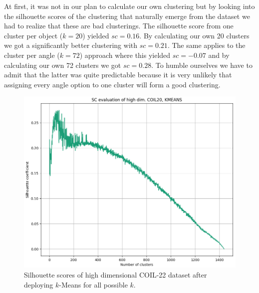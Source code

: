 At first, it was not in our plan to calculate our own clustering but by looking into the silhouette scores of the clustering that naturally emerge from the dataset we had to realize that these are bad clusterings. The silhouette score from one cluster per object ($k=20$) yielded $sc=0.16$. By calculating our own 20 clusters we got a significantly better clustering with $sc=0.21$. The same applies to the cluster per angle ($k=72$) approach where this yielded $sc=-0.07$ and by calculating our own 72 clusters we got $sc=0.28$. To humble ourselves we have to admit that the latter was quite predictable because it is very unlikely that assigning every angle option to one cluster will form a good clustering.

\begin{figure}[!]
	\centering
	\includegraphics[width=0.85\columnwidth]{images/SC_KMEANS_COIL20_high.png}
	\caption[Silhouette Scores for COIL-20]{Silhouette scores of high dimensional COIL-22 dataset after deploying $k$-Means for all possible $k$.}
    \label{fig:SC_KMEANS_COIL20_high}
\end{figure}

